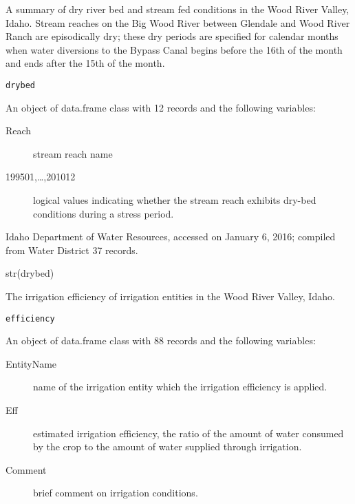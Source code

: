 \documentclass[a4paper]{book}
\begin{document}
%
\begin{Description}\relax
A summary of dry river bed and stream fed conditions in the Wood River Valley, Idaho.
Stream reaches on the Big Wood River between Glendale and Wood River Ranch are episodically dry;
these dry periods are specified for calendar months when water diversions to the
Bypass Canal begins before the 16th of the month and ends after the 15th of the month.
\end{Description}
%
\begin{Usage}
\begin{verbatim}
drybed
\end{verbatim}
\end{Usage}
%
\begin{Format}
An object of data.frame class with 12 records and the following variables:
\begin{description}

\item[Reach] stream reach name
\item[199501,\dots,201012] logical values indicating whether the stream reach exhibits
dry-bed conditions during a stress period.

\end{description}

\end{Format}
%
\begin{Source}\relax
Idaho Department of Water Resources, accessed on January 6, 2016;
compiled from Water District 37 records.
\end{Source}
%
\begin{Examples}
\begin{ExampleCode}
str(drybed)

\end{ExampleCode}
\end{Examples}
%
\begin{Description}\relax
The irrigation efficiency of irrigation entities in the Wood River Valley, Idaho.
\end{Description}
%
\begin{Usage}
\begin{verbatim}
efficiency
\end{verbatim}
\end{Usage}
%
\begin{Format}
An object of data.frame class with 88 records and the following variables:
\begin{description}

\item[EntityName] name of the irrigation entity which the irrigation efficiency is applied.
\item[Eff] estimated irrigation efficiency, the ratio of the amount of
water consumed by the crop to the amount of water supplied through irrigation.
\item[Comment] brief comment on irrigation conditions.

\end{description}

\end{Format}
\end{document}
